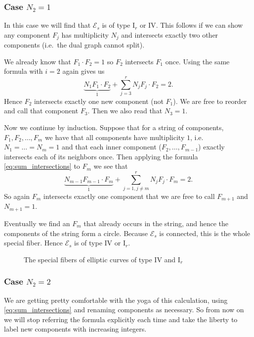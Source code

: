 \subsubsection{Case $N_2 = 1$} 
In this case we will find that $\mathscr E_s$ is of type $\text{I}_r$ or $\text{IV}$. This follows if we can show any component $F_j$ has multiplicity $N_j$ and intersects exactly two other components (i.e.\ the dual graph cannot split). 

We already know that $F_1 \cdot F_2 = 1$ so $F_2$ intersects $F_1$ once. Using the same formula with $i = 2$ again gives us \[
	\underbrace{N_1 F_1\cdot F_2}_{1} + \sum_{j = 3}^{r}  N_j F_j \cdot F_2 = 2
.\] 
Hence $F_2$ intersects exactly one new component (not $F_1$). We are free to reorder and call that component $F_3$. Then we also read that $N_3 = 1$.  

Now we continue by induction. Suppose that for a string of components, $F_1, F_2, \ldots, F_m$ we have that all components have multiplicity $1$, i.e.\ $N_1 = \ldots = N_{m} = 1$ and that each inner component ($F_2, \ldots, F_{m -1}$) exactly intersects each of its neighbors once. 
Then applying the formula \eqref{eq:sum_intersections} to $F_m$ we see that \[
	\underbrace{N_{m -1} F_{m - 1} \cdot F_m}_1 + \sum_{j= 1, j\ne m}^{r} N_j F_j \cdot F_m  = 2
.\] 
So again $F_m$ intersects exactly one component that we are free to call $F_{m + 1}$ and $N_{m + 1} = 1$. 

Eventually we find an $F_m$ that already occurs in the string, and hence the components of the string form a circle. Because $\mathscr E _s$ is connected, this is the whole special fiber.  Hence $\mathscr E _s $ is of type $\text{IV}$ or $\text{I}_{r}$. 

\begin{figure}[ht]
    \centering
    \caption{The special fibers of elliptic curves of type $\text{IV}$ and $\mathrm{I}_r$}
    \label{fig:type-iv-and-ir}
\end{figure}

\subsubsection{Case $N_2 = 2$} 
We are getting pretty comfortable with the yoga of this calculation,  using \eqref{eq:sum_intersections} and renaming components as necessary. 
So from now on we will stop referring the formula explicitly each time and take the liberty to label new components with increasing integers.

